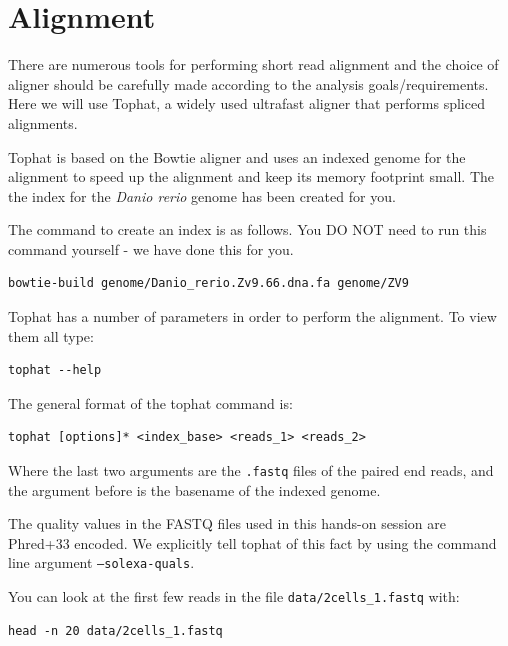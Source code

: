 \section{Alignment}
There are numerous tools for performing short read alignment and the choice of aligner
should be carefully made according to the analysis goals/requirements. Here we will
use Tophat, a widely used ultrafast aligner that performs spliced alignments.

Tophat is based on the Bowtie aligner and uses an indexed genome for the
alignment to speed up the alignment and keep its memory footprint small. 
The the index for the \textit{Danio rerio} genome has been created for you. 

\begin{warning}
The command to create an index is as follows. You DO NOT need to run this command
yourself - we have done this for you.
\begin{lstlisting}
bowtie-build genome/Danio_rerio.Zv9.66.dna.fa genome/ZV9
\end{lstlisting}
\end{warning}

\begin{steps}
Tophat has a number of parameters in order to perform the alignment. To view them all type:
\begin{lstlisting}
tophat --help
\end{lstlisting}
\end{steps}

\begin{information}
The general format of the tophat command is:
\begin{lstlisting}[style=command_syntax]
tophat [options]* <index_base> <reads_1> <reads_2>
\end{lstlisting}

Where the last two arguments are the \texttt{.fastq} files of the paired end
reads, and the argument before is the basename of the indexed genome.
\end{information}

\begin{note}
The quality values in the FASTQ files used in this hands-on session are Phred+33
encoded. We explicitly tell tophat of this fact by using the command line
argument \texttt{--solexa-quals}.
\end{note}

\begin{information}
You can look at the first few reads in the file \texttt{data/2cells\_1.fastq} with:
 
\begin{lstlisting}
head -n 20 data/2cells_1.fastq
\end{lstlisting}
\end{information}

